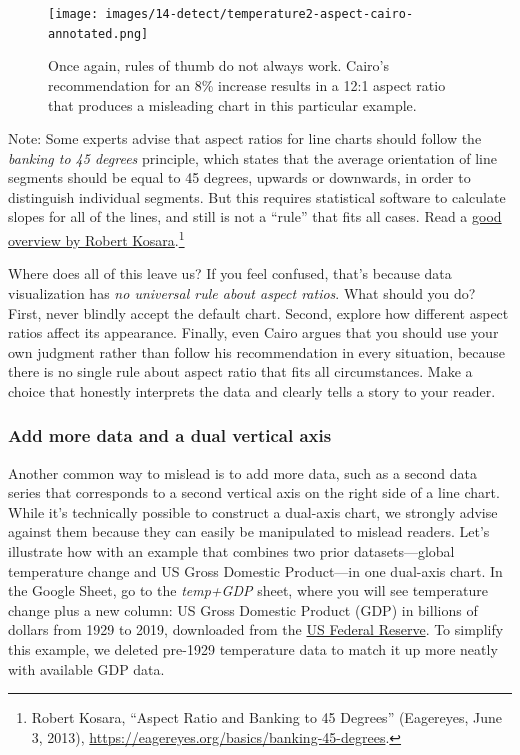 \documentclass[
  english,
]{book}
\begin{document}
\begin{figure}
\centering
\texttt{[image: images/14-detect/temperature2-aspect-cairo-annotated.png]}
\caption{\label{fig:temperature2-aspect-cairo}Once again, rules of thumb do not always work. Cairo's recommendation for an 8\% increase results in a 12:1 aspect ratio that produces a misleading chart in this particular example.}
\end{figure}

Note: Some experts advise that aspect ratios for line charts should follow the \emph{banking to 45 degrees} principle, which states that the average orientation of line segments should be equal to 45 degrees, upwards or downwards, in order to distinguish individual segments. But this requires statistical software to calculate slopes for all of the lines, and still is not a ``rule'' that fits all cases. Read a \href{https://eagereyes.org/basics/banking-45-degrees}{good overview by Robert Kosara}.\footnote{Robert Kosara, {``Aspect {Ratio} and {Banking} to 45 {Degrees}''} ({Eagereyes}, June 3, 2013), \url{https://eagereyes.org/basics/banking-45-degrees}.}

Where does all of this leave us? If you feel confused, that's because data visualization has \emph{no universal rule about aspect ratios}. What should you do? First, never blindly accept the default chart. Second, explore how different aspect ratios affect its appearance. Finally, even Cairo argues that you should use your own judgment rather than follow his recommendation in every situation, because there is no single rule about aspect ratio that fits all circumstances. Make a choice that honestly interprets the data and clearly tells a story to your reader.

\hypertarget{add-more-data-and-a-dual-vertical-axis}{%
\subsubsection*{Add more data and a dual vertical axis}\label{add-more-data-and-a-dual-vertical-axis}}

Another common way to mislead is to add more data, such as a second data series that corresponds to a second vertical axis on the right side of a line chart. While it's technically possible to construct a dual-axis chart, we strongly advise against them because they can easily be manipulated to mislead readers. Let's illustrate how with an example that combines two prior datasets---global temperature change and US Gross Domestic Product---in one dual-axis chart. In the Google Sheet, go to the \emph{temp+GDP} sheet, where you will see temperature change plus a new column: US Gross Domestic Product (GDP) in billions of dollars from 1929 to 2019, downloaded from the \href{https://fred.stlouisfed.org/series/GDPA}{US Federal Reserve}. To simplify this example, we deleted pre-1929 temperature data to match it up more neatly with available GDP data.
\end{document}
